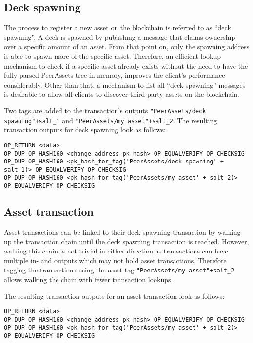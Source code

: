 \documentclass[a4paper,10pt]{article}
\begin{document}
\subsection{Deck spawning}
The process to register a new asset on the blockchain is referred to as ``deck spawning''. A deck is spawned by publishing a message that claims ownership over a specific amount of an asset. From that point on, only the spawning address is able to spawn more of the specific asset. Therefore, an efficient lookup mechanism to check if a specific asset already exists without the need to have the fully parsed PeerAssets tree in memory, improves the client's performance considerably. Other than that, a mechanism to list all ``deck spawning'' messages is desirable to allow all clients to discover third-party assets on the blockchain.

Two tags are added to the transaction's outputs \verb|"PeerAssets/deck spawning"+salt_1| and \verb|"PeerAssets/my asset"+salt_2|.
The resulting transaction outputs for deck spawning look as follows:
\begin{small}\begin{verbatim}
OP_RETURN <data>
OP_DUP OP_HASH160 <change_address_pk_hash> OP_EQUALVERIFY OP_CHECKSIG
OP_DUP OP_HASH160 <pk_hash_for_tag('PeerAssets/deck spawning' + salt_1)> OP_EQUALVERIFY OP_CHECKSIG
OP_DUP OP_HASH160 <pk_hash_for_tag('PeerAssets/my asset' + salt_2)> OP_EQUALVERIFY OP_CHECKSIG
\end{verbatim}\end{small}

\subsection{Asset transaction}
Asset transactions can be linked to their deck spawning transaction by walking up the transaction chain until the deck spawning transaction is reached.
However, walking this chain is not trivial in either direction as transactions can have multiple in- and outputs which may not hold asset transactions.
Therefore tagging the transactions using the asset tag \verb|"PeerAssets/my asset"+salt_2| allows walking the chain with fewer transaction lookups.

The resulting transaction outputs for an asset transaction look as follows:
\begin{small}\begin{verbatim}
OP_RETURN <data>
OP_DUP OP_HASH160 <change_address_pk_hash> OP_EQUALVERIFY OP_CHECKSIG
OP_DUP OP_HASH160 <pk_hash_for_tag('PeerAssets/my asset' + salt_2)> OP_EQUALVERIFY OP_CHECKSIG
\end{verbatim}\end{small}
\end{document}
